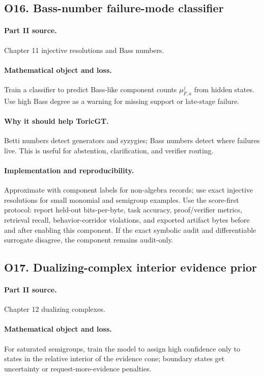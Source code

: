 \documentclass[11pt]{article}
\theoremstyle{definition}
\begin{document}
\subsection{O16. Bass-number failure-mode classifier}
\paragraph{Part II source.} Chapter 11 injective resolutions and Bass numbers.
\paragraph{Mathematical object and loss.} Train a classifier to predict Bass-like component counts $\mu^j_{F,a}$ from hidden states.  Use high Bass degree as a warning for missing support or late-stage failure.
\paragraph{Why it should help ToricGT.} Betti numbers detect generators and syzygies; Bass numbers detect where failures live.  This is useful for abstention, clarification, and verifier routing.
\paragraph{Implementation and reproducibility.} Approximate with component labels for non-algebra records; use exact injective resolutions for small monomial and semigroup examples.  Use the score-first protocol: report held-out bits-per-byte, task accuracy, proof/verifier metrics, retrieval recall, behavior-corridor violations, and exported artifact bytes before and after enabling this component.  If the exact symbolic audit and differentiable surrogate disagree, the component remains audit-only.


\subsection{O17. Dualizing-complex interior evidence prior}
\paragraph{Part II source.} Chapter 12 dualizing complexes.
\paragraph{Mathematical object and loss.} For saturated semigroups, train the model to assign high confidence only to states in the relative interior of the evidence cone; boundary states get uncertainty or request-more-evidence penalties.
\end{document}
